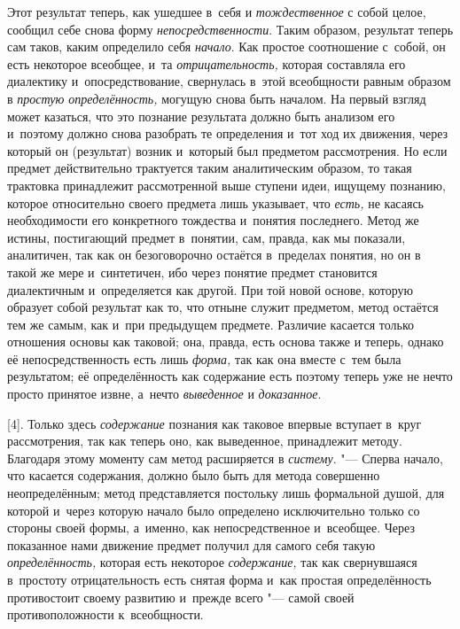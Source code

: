 Этот результат теперь, как ушедшее в~себя и {\em тождественное} с
собой целое, сообщил себе снова форму {\em непосредственности}.
Таким образом, результат теперь сам таков, каким определило
себя {\em начало}. Как
простое соотношение с~собой, он есть некоторое всеобщее, и~та
{\em отрицательность,}
которая составляла его диалектику и~опосредствование,
свернулась в~этой всеобщности равным образом в
{\em простую определённость,}
могущую снова быть началом. На первый взгляд может казаться,
что это познание результата должно быть анализом его и~поэтому должно снова
разобрать те определения и~тот ход их движения, через который он
(результат) возник и~который был предметом рассмотрения. Но если предмет
действительно трактуется таким аналитическим образом, то такая трактовка
принадлежит рассмотренной выше ступени идеи, ищущему познанию, которое
относительно своего предмета лишь указывает, что {\em есть,} не касаясь
необходимости его конкретного тождества и~понятия последнего. Метод же
истины, постигающий предмет в~понятии, сам, правда, как мы показали,
аналитичен, так как он безоговорочно остаётся в~пределах понятия, но он в
такой же мере и~синтетичен, ибо через понятие предмет становится
диалектичным и~определяется как другой. При той новой основе, которую
образует собой результат как то, что отныне служит предметом, метод
остаётся тем же самым, как и~при предыдущем предмете. Различие касается
только отношения основы как таковой; она, правда, есть основа также и
теперь, однако её непосредственность есть лишь {\em форма,} так как она
вместе с~тем была результатом; её определённость как содержание есть
поэтому теперь уже не нечто просто принятое извне, а~нечто
{\em выведенное} и {\em доказанное}.

[4]. Только здесь {\em содержание} познания
как таковое впервые вступает в~круг рассмотрения, так как теперь оно, как
выведенное, принадлежит методу. Благодаря этому моменту сам метод
расширяется в {\em систему}. "---
Сперва начало, что касается содержания, должно было быть для
метода совершенно неопределённым; метод представляется постольку лишь
формальной душой, для которой и~через которую начало было определено
исключительно только со стороны своей формы, а~именно, как непосредственное
и~всеобщее. Через показанное нами движение предмет получил для самого себя
такую {\em определённость,} которая есть некоторое {\em содержание,} так как
свернувшаяся в~простоту отрицательность есть снятая форма и~как простая
определённость противостоит своему развитию и~прежде всего
"--- самой своей противоположности к~всеобщности.

